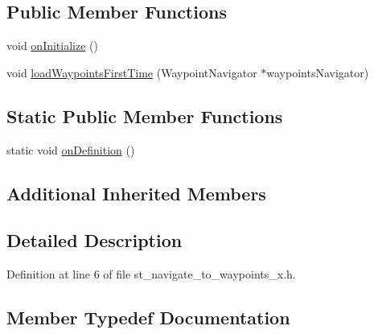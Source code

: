 \subsection*{Public Member Functions}
\begin{DoxyCompactItemize}
\item 
void \hyperlink{structsm__dance__bot_1_1StNavigateToWaypointsX_a5954a62667839c5b56ff07ebd26541d7}{on\+Initialize} ()
\item 
void \hyperlink{structsm__dance__bot_1_1StNavigateToWaypointsX_afbffeff85035562723564a884314f1f6}{load\+Waypoints\+First\+Time} (Waypoint\+Navigator $\ast$waypoints\+Navigator)
\end{DoxyCompactItemize}
\subsection*{Static Public Member Functions}
\begin{DoxyCompactItemize}
\item 
static void \hyperlink{structsm__dance__bot_1_1StNavigateToWaypointsX_abfa4eb3045794e95b79852f0c328b03e}{on\+Definition} ()
\end{DoxyCompactItemize}
\subsection*{Additional Inherited Members}


\subsection{Detailed Description}


Definition at line 6 of file st\+\_\+navigate\+\_\+to\+\_\+waypoints\+\_\+x.\+h.



\subsection{Member Typedef Documentation}

